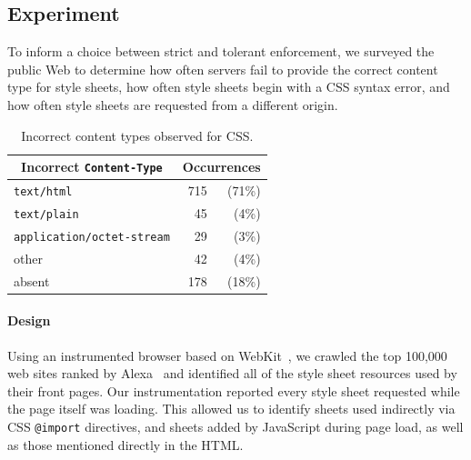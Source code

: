 \documentclass{acm_proc_article-sp}
\begin{document}
\subsection{Experiment}
To inform a choice between strict and tolerant enforcement, we
surveyed the public Web to determine how often servers fail to provide
the correct content type for style sheets, how often style
sheets begin with a CSS syntax error, and how often style sheets are
requested from a different origin.

\begin{table}[b]
\centering
\begin{tabular}{lrr}
\toprule
\multicolumn{1}{c}{Incorrect \texttt{Content-Type}}&
\multicolumn{2}{c}{Occurrences}\\
\midrule
               \texttt{text/html}& 715& (71\%)\\
              \texttt{text/plain}&  45&  (4\%)\\
\texttt{application/octet-stream}&  29&  (3\%)\\
                            other&  42&  (4\%)\\
                           absent& 178& (18\%)\\
\bottomrule
\end{tabular}
\caption{Incorrect content types observed for CSS.}
\label{table:MIME}
\end{table}

\paragraph{Design}
Using an instrumented browser based on WebKit~\cite{webkit}, we
crawled the top 100,000 web sites ranked by Alexa~\cite{alexa} and
identified all of the style sheet resources used by their front pages.
Our instrumentation reported every style sheet requested while the
page itself was loading.  This allowed us to identify sheets used
indirectly via CSS \verb|@import| directives, and sheets added by
JavaScript during page load, as well as those mentioned directly in
the HTML.
\end{document}
